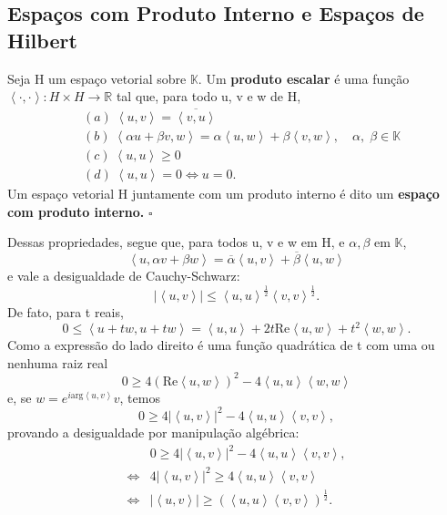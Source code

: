 \documentclass[../functional_analysis.tex]{subfiles}
\begin{document}
\subsection{Espaços com Produto Interno e Espaços de Hilbert}
\begin{def*}
	Seja H um espaço vetorial sobre \(\mathbb{K}.\) Um \textbf{produto escalar} é uma função \(\left< \cdot , \cdot  \right>: H\times H\rightarrow \mathbb{R}\) tal que, para todo u, v e w de H,
	\begin{align*}
		 & (a)\; \left< u, v \right> = \overline{\left< v, u \right>}                                                                                \\
		 & (b)\; \left< \alpha u + \beta v, w \right> = \alpha \left< u, w \right> + \beta \left< v, w \right>, \quad \alpha,\; \beta \in \mathbb{K} \\
		 & (c)\; \left< u, u \right>\geq 0                                                                                                           \\
		 & (d)\; \left< u, u \right> = 0 \Longleftrightarrow u = 0.
	\end{align*}
	Um espaço vetorial H juntamente com um produto interno é dito um \textbf{espaço com produto interno.} \(\square\)
\end{def*}

Dessas propriedades, segue que, para todos u, v e w em H, e \(\alpha , \beta \) em \(\mathbb{K}\),
\[
	\left< u, \alpha v + \beta w \right> = \overline{\alpha }\left< u, v \right> + \overline{\beta }\left< u, w \right>
\]
e vale a \hypertarget{cauchy_schwarz}{desigualdade de Cauchy-Schwarz}:
\[
	| \left< u, v \right> | \leq \left< u, u \right>^{\frac{1}{2}}\left< v, v \right>^{\frac{1}{2}}.
\]
De fato, para t reais,
\[
	0\leq \left< u+tw, u+tw \right> = \left< u, u \right> + 2t \mathrm{Re}\left< u, w \right> + t^{2}\left< w, w \right>.
\]
Como a expressão do lado direito é uma função quadrática de t com uma ou nenhuma raiz real
\[
	0\geq 4(\mathrm{Re}\left< u, w \right>)^{2} - 4 \left< u, u \right>\left< w, w \right>
\]
e, se \(w = e^{i \mathrm{arg}\left< u, v \right>}v\), temos
\[
	0\geq 4 | \left< u, v \right> |^{2} - 4 \left< u, u \right>\left< v, v \right>,
\]
provando a desigualdade por manipulação algébrica:
\begin{align*}
	                    & 0\geq 4 | \left< u, v \right> |^{2} - 4 \left< u, u \right>\left< v, v \right>,      \\
	\Longleftrightarrow & 4 | \left< u, v \right> |^{2} \geq 4 \left< u, u \right>\left< v, v \right>          \\
	\Longleftrightarrow & | \left< u, v \right> | \geq (\left< u, u \right>\left< v, v \right>)^{\frac{1}{2}}.
\end{align*}
\end{document}
